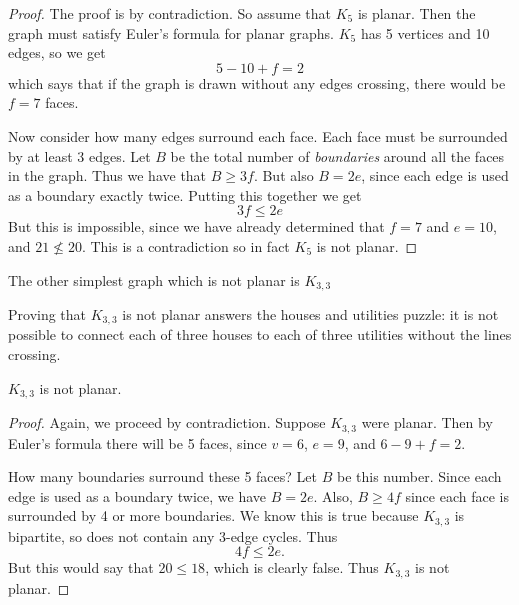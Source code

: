\documentclass[12pt]{article}
\begin{document}
\begin{proof}
  The proof is by contradiction.  So assume that $K_5$ is planar.  Then the graph must satisfy Euler's formula for planar graphs.  $K_5$ has 5 vertices and 10 edges, so we get
  \[5 - 10 + f = 2\]
  which says that if the graph is drawn without any edges crossing, there would be $f = 7$ faces.

  Now consider how many edges surround each face.  Each face must be surrounded by at least 3 edges.  Let $B$ be the total number of {\em boundaries} around all the faces in the graph.  Thus we have that $B \ge 3f$.  But also $B = 2e$, since each edge is used as a boundary exactly twice.  Putting this together we get
  \[3f \le 2e\]
  But this is impossible, since we have already determined that $f = 7$ and $e = 10$, and $21 \not\le 20$.  This is a contradiction so in fact $K_5$ is not planar.
\end{proof}

The other simplest graph which is not planar is $K_{3,3}$
    \begin{center}
    \end{center}

Proving that $K_{3,3}$ is not planar answers the houses and utilities puzzle: it is not possible to connect each of three houses to each of three utilities without the lines crossing.

\begin{theorem}
  $K_{3,3}$ is not planar.
\end{theorem}

\begin{proof}
  Again, we proceed by contradiction.  Suppose $K_{3,3}$ were planar.  Then by Euler's formula there will be 5 faces, since $v = 6$, $e = 9$, and $6 - 9 + f = 2$.

  How many boundaries surround these 5 faces?  Let $B$ be this number.  Since each edge is used as a boundary twice, we have $B = 2e$.  Also, $B \ge 4f$ since each face is surrounded by 4 or more boundaries.  We know this is true because $K_{3,3}$ is bipartite, so does not contain any 3-edge cycles.  Thus
  \[4f \le 2e.\]
  But this would say that $20 \le 18$, which is clearly false.  Thus $K_{3,3}$ is not planar.
\end{proof}
\end{document}
